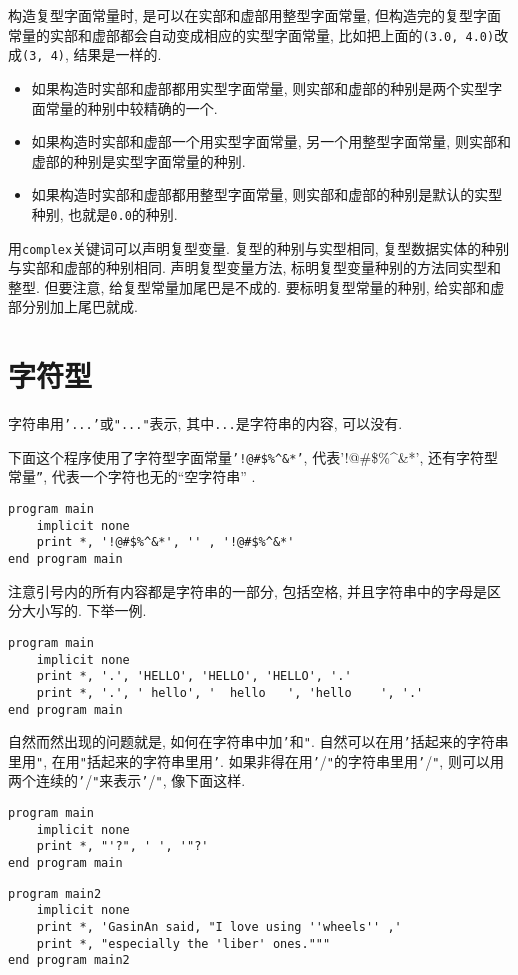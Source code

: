 构造复型字面常量时, 是可以在实部和虚部用整型字面常量, 但构造完的复型字面常量的实部和虚部都会自动变成相应的实型字面常量, 比如把上面的\texttt{(3.0, 4.0)}改成\texttt{(3, 4)}, 结果是一样的.
\begin{itemize}
    \item 如果构造时实部和虚部都用实型字面常量, 则实部和虚部的种别是两个实型字面常量的种别中较精确的一个.
    \item 如果构造时实部和虚部一个用实型字面常量, 另一个用整型字面常量, 则实部和虚部的种别是实型字面常量的种别.
    \item 如果构造时实部和虚部都用整型字面常量, 则实部和虚部的种别是默认的实型种别, 也就是\texttt{0.0}的种别.
\end{itemize}

用\texttt{complex}关键词可以声明复型变量. 复型的种别与实型相同, 复型数据实体的种别与实部和虚部的种别相同. 声明复型变量方法, 标明复型变量种别的方法同实型和整型. 但要注意, 给复型常量加尾巴是不成的. 要标明复型常量的种别, 给实部和虚部分别加上尾巴就成.

\section{字符型}\label{fortran_char}

字符串用\texttt{'...'}或\texttt{"..."}表示, 其中\texttt{...}是字符串的内容, 可以没有.

下面这个程序使用了字符型字面常量\texttt{'!@\#{}\${}\%{}\^{}\&{}*'}, 代表'!@\#{}\${}\%{}\^{}\&{}*', 还有字符型常量\texttt{''}, 代表一个字符也无的``空字符串'' .
\begin{lstlisting}
program main
    implicit none
    print *, '!@#$%^&*', '' , '!@#$%^&*'
end program main
\end{lstlisting}

注意引号内的所有内容都是字符串的一部分, 包括空格, 并且字符串中的字母是区分大小写的. 下举一例.
\begin{lstlisting}
program main
    implicit none
    print *, '.', 'HELLO', 'HELLO', 'HELLO', '.'
    print *, '.', ' hello', '  hello   ', 'hello    ', '.'
end program main
\end{lstlisting}

自然而然出现的问题就是, 如何在字符串中加\texttt{'}和\texttt{"}. 自然可以在用\texttt{'}括起来的字符串里用\texttt{"}, 在用\texttt{"}括起来的字符串里用\texttt{'}. 如果非得在用\texttt{'}/\texttt{"}的字符串里用\texttt{'}/\texttt{"}, 则可以用两个连续的\texttt{'}/\texttt{"}来表示\texttt{'}/\texttt{"}, 像下面这样.
\begin{lstlisting}
program main
    implicit none
    print *, "'?", ' ', '"?'
end program main
\end{lstlisting}
\begin{lstlisting}
program main2
    implicit none
    print *, 'GasinAn said, "I love using ''wheels'' ,'
    print *, "especially the 'liber' ones."""
end program main2
\end{lstlisting}

